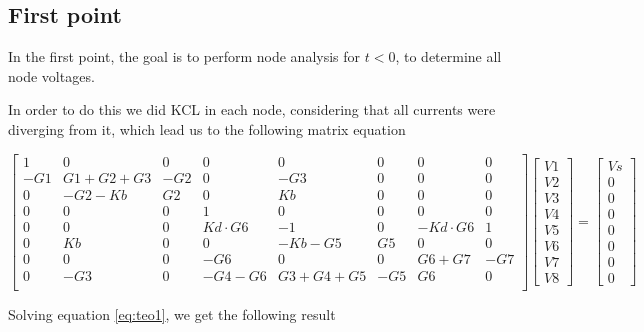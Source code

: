 \subsection{First point}
\label{ssec:1T}
\noindent \par In the first point, the goal is to perform node analysis for $t<0$, to determine all node voltages.
\par In order to do this we did KCL in each node, considering that all currents were diverging from it, which lead us to the following matrix equation

\begin{equation}
\label{eq:teo1}
	\begin{bmatrix}
	1 & 0 & 0 & 0 & 0 & 0 & 0 & 0 \\ -G1 & G1+G2+G3 & -G2 & 0 & -G3 & 0 & 0 & 0 \\ 0 & -G2-Kb & G2 & 0 & Kb & 0 & 0 & 0 \\ 0 & 0 & 0 & 1 & 0 & 0 & 0 & 0 \\ 0 & 0 & 0 & Kd \cdot G6 & -1 & 0 & -Kd 		\cdot G6 & 1 \\ 0 & Kb & 0 & 0 & -Kb-G5 & G5 & 0 & 0 \\ 0 & 0 & 0 & -G6 & 0 & 0 & G6+G7 & -G7 \\ 0 & -G3 & 0 & -G4-G6 & G3+G4+G5 & -G5 & G6 & 0 \\
	\end{bmatrix}
	\begin{bmatrix}
	V1 \\ V2 \\ V3 \\ V4 \\ V5 \\ V6 \\ V7 \\ V8
	\end{bmatrix}
	=
	\begin{bmatrix}
	Vs \\ 0 \\ 0 \\ 0 \\ 0 \\ 0 \\ 0 \\ 0
	\end{bmatrix}
\end{equation}

\par Solving equation \ref{eq:teo1}, we get the following result

\begin{table}[H]
\centering
\begin{tabularx}{0.8\textwidth} {
  | >{\raggedright\arraybackslash}X
  | >{\raggedleft\arraybackslash}X | }
 \hline
 
\end{tabularx}
\end{table}

